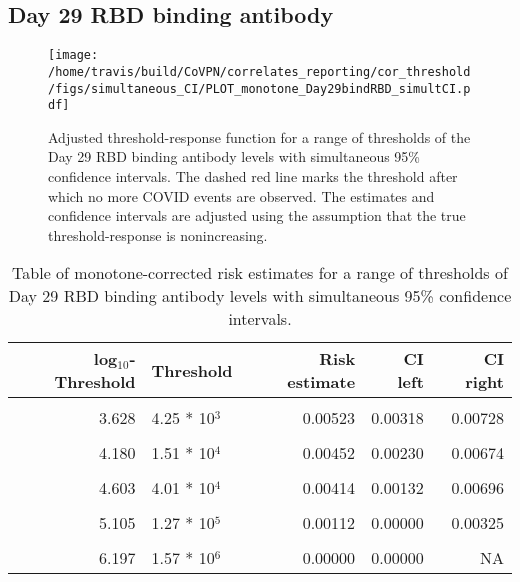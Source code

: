 \documentclass[]{book}
\theoremstyle{definition}
\theoremstyle{definition}
\theoremstyle{definition}
\newcommand{\1}{\mathbbm{1}}
\begin{document}
\newpage

\newpage

\newpage

\hypertarget{day-29-rbd-binding-antibody-3}{%
\subsection{Day 29 RBD binding antibody}\label{day-29-rbd-binding-antibody-3}}

\begin{figure}[H]
\centering
\texttt{[image: /home/travis/build/CoVPN/correlates\_reporting/cor\_threshold/figs/simultaneous\_CI/PLOT\_monotone\_Day29bindRBD\_simultCI.pdf]}
\caption{Adjusted threshold-response function for a range of thresholds of the
  Day 29 RBD binding antibody levels with simultaneous 95\% confidence intervals. The dashed red line marks the threshold after which no more COVID events are observed. The estimates and confidence intervals are adjusted using the assumption that the true threshold-response is nonincreasing.}
\end{figure}
\begin{table}[!h]

\caption{\label{tab:unnamed-chunk-405}Table of monotone-corrected risk estimates for a range of thresholds of Day 29 RBD binding antibody levels with simultaneous 95\% confidence intervals.}
\centering
\begin{tabular}[t]{rlrrr}
\toprule
log$_{10}$-Threshold & Threshold & Risk estimate & CI left & CI right\\
\midrule
\cellcolor{gray!6}{2.882} & \cellcolor{gray!6}{7.62 * 10$^2$} & \cellcolor{gray!6}{0.00576} & \cellcolor{gray!6}{0.00374} & \cellcolor{gray!6}{0.00779}\\
3.628 & 4.25 * 10$^3$ & 0.00523 & 0.00318 & 0.00728\\
\cellcolor{gray!6}{3.889} & \cellcolor{gray!6}{7.74 * 10$^3$} & \cellcolor{gray!6}{0.00459} & \cellcolor{gray!6}{0.00255} & \cellcolor{gray!6}{0.00663}\\
4.180 & 1.51 * 10$^4$ & 0.00452 & 0.00230 & 0.00674\\
\cellcolor{gray!6}{4.395} & \cellcolor{gray!6}{2.48 * 10$^4$} & \cellcolor{gray!6}{0.00452} & \cellcolor{gray!6}{0.00183} & \cellcolor{gray!6}{0.00721}\\
4.603 & 4.01 * 10$^4$ & 0.00414 & 0.00132 & 0.00696\\
\cellcolor{gray!6}{4.826} & \cellcolor{gray!6}{6.70 * 10$^4$} & \cellcolor{gray!6}{0.00365} & \cellcolor{gray!6}{0.00054} & \cellcolor{gray!6}{0.00676}\\
5.105 & 1.27 * 10$^5$ & 0.00112 & 0.00000 & 0.00325\\
\cellcolor{gray!6}{5.422} & \cellcolor{gray!6}{2.64 * 10$^5$} & \cellcolor{gray!6}{0.00112} & \cellcolor{gray!6}{0.00000} & \cellcolor{gray!6}{0.00400}\\
6.197 & 1.57 * 10$^6$ & 0.00000 & 0.00000 & NA\\
\bottomrule
\end{tabular}
\end{table}
\end{document}
